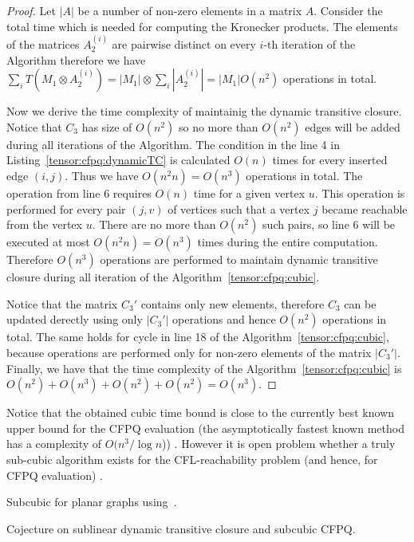 \begin{proof}
 Let $|A|$ be a number of non-zero elements in a matrix $A$. Consider the total time which is needed for computing the Kronecker products. The elements of the matrices $A_2^{(i)}$ are pairwise distinct on every $i$-th iteration of the Algorithm therefore we have $\sum\limits_i{T(M_1 \otimes A_2^{(i)})} = |M_1| \otimes \sum\limits_i {|A_2^{(i)}|} = |M_1|O(n^2)$ operations in total. 


Now we derive the time complexity of maintainig the dynamic transitive closure. Notice that $C_3$ has size of $O(n^2)$ so no more than $O(n^2)$ edges will be added during all iterations of the Algorithm. The condition in the line 4 in Listing~\ref{tensor:cfpq:dynamicTC} is calculated $O(n)$ times for every inserted edge $(i, j)$. Thus we have $O(n^2n) = O(n^3)$ operations in total. The operation from line 6 requires $O(n)$ time for a given vertex $u$. This operation is performed for every pair $(j, v)$ of vertices such that a vertex $j$ became reachable from the vertex $u$. There are no more than $O(n^2)$ such pairs, so line 6 will be executed at most $O(n^2n)= O(n^3)$ times during the entire computation. Therefore $O(n^3)$ operations are performed to maintain dynamic transitive closure during all iteration of the Algorithm~\ref{tensor:cfpq:cubic}.


Notice that the matrix $C_3'$ contains only new elements, therefore $C_3$ can be updated derectly using only $|C_3'|$ operations and hence $O(n^2)$ operations in total. The same holds for cycle in line 18 of the Algorithm~\ref{tensor:cfpq:cubic}, because operations are performed only for non-zero elements of the matrix $|C_3'|$. Finally, we have that the time complexity of the Algorithm~\ref{tensor:cfpq:cubic} is $O(n^2) + O(n^3) + O(n^2) + O(n^2) = O(n^3)$.
\end{proof}{}
Notice that the obtained cubic time bound is close to the currently best known upper bound for the CFPQ evaluation (the asymptotically fastest known method has a complexity of $O(n^3/\log n$)) \cite{Chaudhuri2008SubcubicAF}. However it is open problem whether a truly sub-cubic algorithm exists for the CFL-reachability problem (and hence, for CFPQ evaluation)  \cite{10.1145/3158118}.


Subcubic for planar graphs using~\cite{10.1007/3-540-57273-2_72}.

Cojecture on sublinear dynamic transitive closure and subcubic CFPQ.